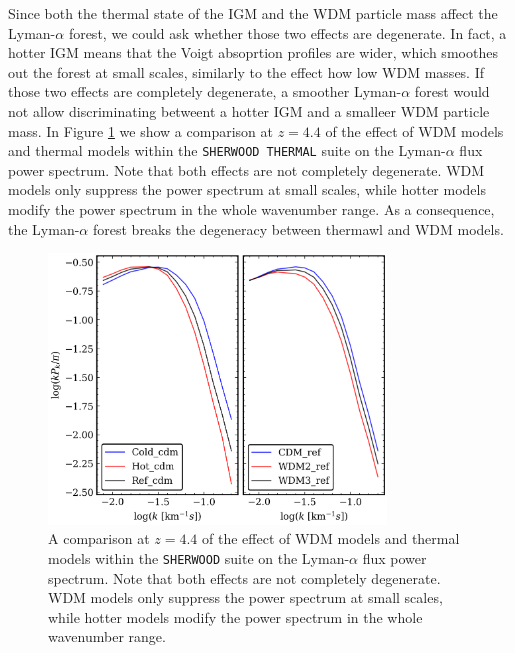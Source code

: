 Since both the thermal state of the IGM and the WDM particle mass affect the Lyman-$\alpha$ forest, we could ask whether those two effects are degenerate. In fact, a hotter IGM means that the Voigt absoprtion profiles are wider, which smoothes out the forest at small scales, similarly to the effect how low WDM masses. If those two effects are completely degenerate, a smoother Lyman-$\alpha$ forest would not allow discriminating betweent a hotter IGM and a smalleer WDM particle mass. In Figure \ref{fig: PS thermal vs WDM} we show a comparison at $z=4.4$ of the effect of WDM models and thermal models within the \texttt{SHERWOOD THERMAL} suite on the Lyman-$\alpha$ flux power spectrum. Note that both effects are not completely degenerate. WDM models only suppress the power spectrum at small scales, while hotter models modify the power spectrum in the whole wavenumber range. As a consequence, the Lyman-$\alpha$ forest breaks the degeneracy between thermawl and WDM models.

\begin{figure}[ht]
        \centering
            \includegraphics[width=0.8\textwidth]{img/ML/PS_thermal_vs_wdm.png}
            \caption{A comparison at $z=4.4$ of the effect of WDM models and thermal models within the \texttt{SHERWOOD} suite on the Lyman-$\alpha$ flux power spectrum. Note that both effects are not completely degenerate. WDM models only suppress the power spectrum at small scales, while hotter models modify the power spectrum in the whole wavenumber range.}
            \label{fig: PS thermal vs WDM}
\end{figure}   




